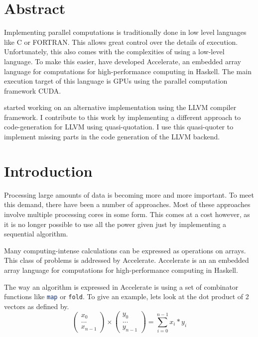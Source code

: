 \documentclass[a4paper,bibliography=totocnumbered,parskip,headsepline]{scrbook}
\begin{document}
\chapter*{Abstract}
Implementing parallel computations is traditionally done in low level languages like C or FORTRAN.
This allows great control over the details of execution.
Unfortunately, this also comes with the complexities of using a low-level language.
To make this easier, \citeauthor{chakravarty2011accelerating} have developed Accelerate, an embedded array language for computations for high-performance computing in Haskell.
The main execution target of this language is GPUs using the parallel computation framework CUDA.

\citeauthor{trevor2014llvm} started working on an alternative implementation using the LLVM compiler framework.
I contribute to this work by implementing a different approach to code-generation for LLVM using quasi-quotation.
I use this quasi-quoter to implement missing parts in the code generation of the LLVM backend.

\tableofcontents   %
\listoffigures     %
\mainmatter

\chapter{Introduction}
Processing large amounts of data is becoming more and more important.
To meet this demand, there have been a number of approaches.
Most of these approaches involve multiple processing cores in some form.
This comes at a cost however, as it is no longer possible to use all the power given just by implementing a sequential algorithm.

Many computing-intense calculations can be expressed as operations on arrays.
This class of problems is addressed by Accelerate\cite{chakravarty2011accelerating,mcdonelloptimising}.
Accelerate is an an embedded array language for computations for high-performance computing in Haskell.

The way an algorithm is expressed in Accelerate is using a set of combinator functions like \lstinline[language=haskell]!map! or \lstinline[language=haskell,morekeywords={fold}]!fold!.
To give an example, lets look at the dot product of 2 vectors as defined by.
\[
\begin{pmatrix}
x_0 \\ ... \\ x_{n-1}
\end{pmatrix}
\times
\begin{pmatrix}
y_0 \\ ... \\ y_{n-1}
\end{pmatrix}
= \displaystyle\sum_{i=0}^{n-1} x_i*y_i
\]
\end{document}
